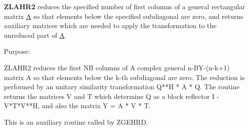 {\bfseries Z\+L\+A\+H\+R2} reduces the specified number of first columns of a general rectangular matrix \hyperlink{classA}{A} so that elements below the specified subdiagonal are zero, and returns auxiliary matrices which are needed to apply the transformation to the unreduced part of \hyperlink{classA}{A}. 

 \begin{DoxyParagraph}{Purpose\+: }
\begin{DoxyVerb} ZLAHR2 reduces the first NB columns of A complex general n-BY-(n-k+1)
 matrix A so that elements below the k-th subdiagonal are zero. The
 reduction is performed by an unitary similarity transformation
 Q**H * A * Q. The routine returns the matrices V and T which determine
 Q as a block reflector I - V*T*V**H, and also the matrix Y = A * V * T.

 This is an auxiliary routine called by ZGEHRD.\end{DoxyVerb}
 
\end{DoxyParagraph}

